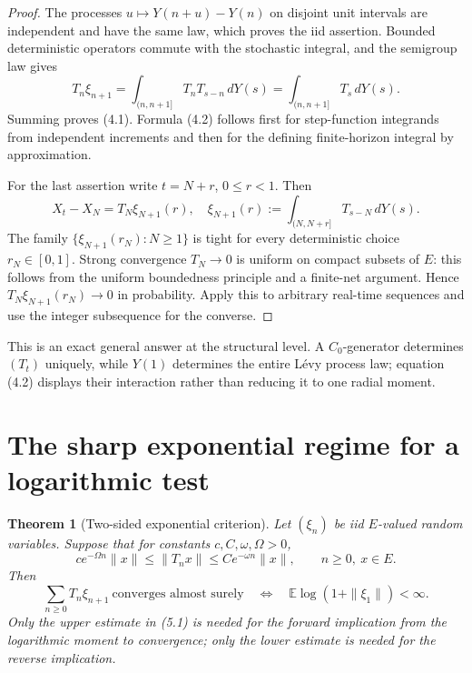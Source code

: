 \documentclass[11pt]{article}
\newtheorem{theorem}{Theorem}
\theoremstyle{remark}
\newcommand{\E}{\mathbb E}
\begin{document}
\begin{proof}
The processes
$u\mapsto Y(n+u)-Y(n)$ on disjoint unit intervals are independent and have
the same law, which proves the iid assertion.  Bounded deterministic
operators commute with the stochastic integral, and the semigroup law gives
\[
 T_n\xi_{n+1}
 =\int_{(n,n+1]}T_nT_{s-n}\,dY(s)
 =\int_{(n,n+1]}T_s\,dY(s).
\]
Summing proves (4.1).  Formula (4.2) follows first for step-function
integrands from independent increments and then for the defining
finite-horizon integral by approximation.

For the last assertion write $t=N+r$, $0\leq r<1$.  Then
\[
 X_t-X_N=T_N\xi_{N+1}(r),
 \quad
 \xi_{N+1}(r):=\int_{(N,N+r]}T_{s-N}\,dY(s).
\]
The family $\{\xi_{N+1}(r_N):N\geq1\}$ is tight for every deterministic
choice $r_N\in[0,1]$.  Strong convergence $T_N\to0$ is uniform on compact
subsets of $E$: this follows from the uniform boundedness principle and a
finite-net argument.  Hence $T_N\xi_{N+1}(r_N)\to0$ in probability.  Apply
this to arbitrary real-time sequences and use the integer subsequence for
the converse.
\end{proof}

This is an exact general answer at the structural level.  A $C_0$-generator
determines $(T_t)$ uniquely, while $Y(1)$ determines the entire L\'evy
process law; equation (4.2) displays their interaction rather than reducing
it to one radial moment.

\section{The sharp exponential regime for a logarithmic test}

\begin{theorem}[Two-sided exponential criterion]\label{thm:log}
Let $(\xi_n)$ be iid $E$-valued random variables.  Suppose that for constants
$c,C,\omega,\Omega>0$,
\[
 c e^{-\Omega n}\|x\|\leq\|T_nx\|
 \leq C e^{-\omega n}\|x\|,
 \qquad n\geq0,\ x\in E.                            \tag{5.1}
\]
Then
\[
 \sum_{n\geq0}T_n\xi_{n+1}\ \text{converges almost surely}
 \quad\Longleftrightarrow\quad
 \E\log(1+\|\xi_1\|)<\infty.                      \tag{5.2}
\]
Only the upper estimate in (5.1) is needed for the forward implication from
the logarithmic moment to convergence; only the lower estimate is needed for
the reverse implication.
\end{theorem}
\end{document}
